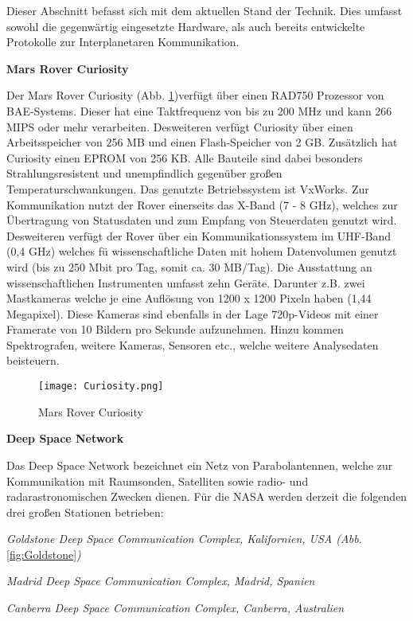 Dieser Abschnitt befasst sich mit dem aktuellen Stand der Technik. Dies umfasst
sowohl die gegenw{\"a}rtig eingesetzte Hardware, als auch bereits
entwickelte Protokolle zur Interplanetaren Kommunikation.


\textbf{Mars Rover Curiosity}

Der Mars Rover Curiosity (Abb. \ref{fig:Curiosity})verf{\"u}gt {\"u}ber einen
RAD750 Prozessor von BAE-Systems.
Dieser hat eine Taktfrequenz von bis zu 200 MHz und kann 266 MIPS oder mehr
verarbeiten. Desweiteren verf{\"u}gt Curiosity {\"u}ber einen Arbeitsspeicher von 256 MB
und einen Flash-Speicher von 2 GB. Zus{\"a}tzlich hat Curiosity einen EPROM von 256
KB. Alle Bauteile sind dabei besonders Strahlungsresistent und unempfindlich
gegen{\"u}ber gro{\ss}en Temperaturschwankungen. Das genutzte Betriebssystem ist
VxWorks. Zur Kommunikation nutzt der Rover
einerseits das X-Band (7 - 8 GHz), welches zur {\"U}bertragung von Statusdaten
und zum Empfang von Steuerdaten genutzt wird. Desweiteren verf{\"u}gt der Rover
{\"u}ber ein Kommunikationssystem im UHF-Band (0,4 GHz) welches f{\"u}
wissenschaftliche Daten mit hohem Datenvolumen genutzt wird (bis zu 250 Mbit
pro Tag, somit ca. 30 MB/Tag). Die Ausstattung an wissenschaftlichen
Instrumenten umfasst zehn Ger{\"a}te. Darunter z.B. zwei Mastkameras welche je
eine Aufl{\"o}sung von 1200 x 1200 Pixeln haben (1,44 Megapixel). Diese Kameras
sind ebenfalls in der Lage 720p-Videos mit einer Framerate von 10 Bildern pro
Sekunde aufzunehmen. Hinzu kommen Spektrografen, weitere Kameras, Sensoren etc.,
welche weitere Analysedaten beisteuern.

\begin{figure}[H]
\centering
\texttt{[image: Curiosity.png]}
\caption{Mars Rover Curiosity}
\label{fig:Curiosity}
\end{figure}

\textbf{Deep Space Network}

Das Deep Space Network bezeichnet ein Netz von Parabolantennen, welche zur
Kommunikation mit Raumsonden, Satelliten sowie radio-
und radarastronomischen Zwecken dienen. F{\"u}r die NASA werden derzeit die
folgenden drei gro{\ss}en Stationen betrieben:

\begin{compactenum}[a)]
\item \textit{Goldstone Deep Space Communication Complex, Kalifornien, USA
(Abb.} \ref{fig:Goldstone}\textit{)}
\item \textit{Madrid Deep Space Communication Complex, Madrid, Spanien}
\item \textit{Canberra Deep Space Communication Complex, Canberra, Australien}
\end{compactenum}

